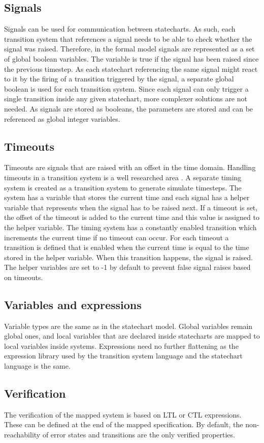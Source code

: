   \subsection{Signals}
Signals can be used for communication between statecharts. As such, each transition system that references a signal needs to be able to check whether the signal was raised. Therefore, in the formal model signals are represented as a set of global boolean variables. The variable is true if the signal has been raised since the previous timestep. As each statechart referencing the same signal might react to it by the firing of a transition triggered by the signal, a separate global boolean is used for each transition system. Since each signal can only trigger a single transition inside any given statechart, more complexer solutions are not needed. As signals are stored as booleans, the parameters are stored and can be referenced as global integer variables.
  \subsection{Timeouts}
Timeouts are signals that are raised with an offset in the time domain. Handling timeouts in a transition system is a well researched area \citep{dutertre2004timed}. A separate timing system is created as a transition system to generate simulate timesteps. The system has a variable that stores the current time and each signal has a helper variable that represents when the signal has to be raised next. If a timeout is set, the offset of the timeout is added to the current time and this value is assigned to the helper variable. The timing system has a constantly enabled transition which increments the current time if no timeout can occur. For each timeout a transition is defined that is enabled when the current time is equal to the time stored in the helper variable. When this transition happens, the signal is raised. The helper variables are set to -1 by default to prevent false signal raises based on timeouts.
  \subsection{Variables and expressions}
Variable types are the same as in the statechart model. Global variables remain global ones, and local variables that are declared inside statecharts are mapped to local variables inside systems. Expressions need no further flattening as the expression library used by the transition system language and the statechart language is the same.
  \subsection{Verification}
The verification of the mapped system is based on LTL or CTL expressions. These can be defined at the end of the mapped specification. By default, the non-reachability of error states and transitions are the only verified properties.
